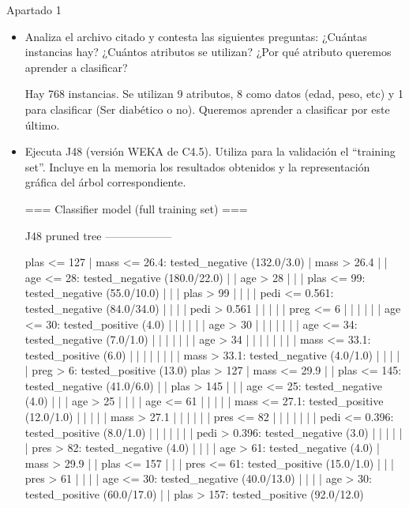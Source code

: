 \documentclass[11pt, a4paper, spanish, openright, twoside]{book}
\begin{document}
\begin{section}{Apartado 1}
	
	\begin{itemize} 
	\item Analiza el archivo citado y contesta las siguientes preguntas: ¿Cuántas instancias hay? ¿Cuántos 
	atributos se utilizan? ¿Por qué atributo queremos aprender a clasificar?

	Hay 768 instancias. Se utilizan 9 atributos, 8 como datos (edad, peso, etc)  y 1 para clasificar (Ser diabético o no). Queremos aprender a clasificar por este último.
 
	\item Ejecuta J48 (versión WEKA de C4.5). Utiliza para la validación el “training set”. Incluye en la 
	memoria los resultados obtenidos y la representación gráfica del árbol correspondiente.


=== Classifier model (full training set) ===

J48 pruned tree
------------------

plas <= 127
|   mass <= 26.4: tested_negative (132.0/3.0)
|   mass > 26.4
|   |   age <= 28: tested_negative (180.0/22.0)
|   |   age > 28
|   |   |   plas <= 99: tested_negative (55.0/10.0)
|   |   |   plas > 99
|   |   |   |   pedi <= 0.561: tested_negative (84.0/34.0)
|   |   |   |   pedi > 0.561
|   |   |   |   |   preg <= 6
|   |   |   |   |   |   age <= 30: tested_positive (4.0)
|   |   |   |   |   |   age > 30
|   |   |   |   |   |   |   age <= 34: tested_negative (7.0/1.0)
|   |   |   |   |   |   |   age > 34
|   |   |   |   |   |   |   |   mass <= 33.1: tested_positive (6.0)
|   |   |   |   |   |   |   |   mass > 33.1: tested_negative (4.0/1.0)
|   |   |   |   |   preg > 6: tested_positive (13.0)
plas > 127
|   mass <= 29.9
|   |   plas <= 145: tested_negative (41.0/6.0)
|   |   plas > 145
|   |   |   age <= 25: tested_negative (4.0)
|   |   |   age > 25
|   |   |   |   age <= 61
|   |   |   |   |   mass <= 27.1: tested_positive (12.0/1.0)
|   |   |   |   |   mass > 27.1
|   |   |   |   |   |   pres <= 82
|   |   |   |   |   |   |   pedi <= 0.396: tested_positive (8.0/1.0)
|   |   |   |   |   |   |   pedi > 0.396: tested_negative (3.0)
|   |   |   |   |   |   pres > 82: tested_negative (4.0)
|   |   |   |   age > 61: tested_negative (4.0)
|   mass > 29.9
|   |   plas <= 157
|   |   |   pres <= 61: tested_positive (15.0/1.0)
|   |   |   pres > 61
|   |   |   |   age <= 30: tested_negative (40.0/13.0)
|   |   |   |   age > 30: tested_positive (60.0/17.0)
|   |   plas > 157: tested_positive (92.0/12.0)


\end{itemize}
\end{section}
\end{document}
